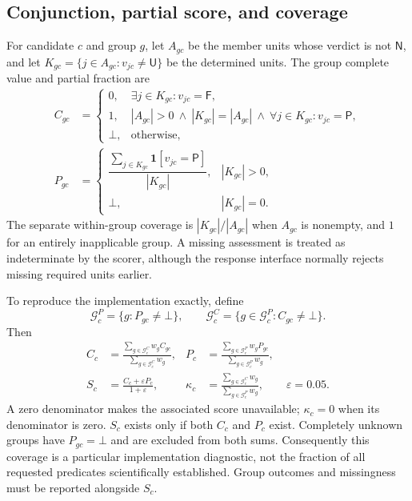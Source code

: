 \documentclass[11pt]{article}
\newcommand{\ind}{\mathbf{1}}
\newcommand{\unknown}{\bot}
\newcommand{\PASS}{\mathsf{P}}
\newcommand{\FAIL}{\mathsf{F}}
\newcommand{\UNK}{\mathsf{U}}
\newcommand{\NA}{\mathsf{N}}
\begin{document}
\subsection{Conjunction, partial score, and coverage}
For candidate $c$ and group $g$, let $A_{gc}$ be the member units whose verdict is
not $\NA$, and let $K_{gc}=\{j\in A_{gc}:v_{jc}\ne\UNK\}$ be the determined
units. The group complete value and partial fraction are
\begin{align}
 C_{gc}&=\begin{cases}
 0,&\exists j\in K_{gc}:v_{jc}=\FAIL,\\
 1,&|A_{gc}|>0\ \land\ |K_{gc}|=|A_{gc}|\ \land\
       \forall j\in K_{gc}:v_{jc}=\PASS,\\
 \unknown,&\text{otherwise},
 \end{cases}\\
 P_{gc}&=\begin{cases}
 \dfrac{\sum_{j\in K_{gc}}\ind[v_{jc}=\PASS]}{|K_{gc}|},&|K_{gc}|>0,\\
 \unknown,&|K_{gc}|=0.
 \end{cases}
 \label{eq:group}
\end{align}
The separate within-group coverage is $|K_{gc}|/|A_{gc}|$ when $A_{gc}$ is
nonempty, and $1$ for an entirely inapplicable group. A missing assessment is
treated as indeterminate by the scorer, although the response interface normally
rejects missing required units earlier.

To reproduce the implementation exactly, define
\begin{equation}
 \mathcal G_c^P=\{g:P_{gc}\ne\unknown\},\qquad
 \mathcal G_c^C=\{g\in\mathcal G_c^P:C_{gc}\ne\unknown\}.
\end{equation}
Then
\begin{align}
 C_c&=\frac{\sum_{g\in\mathcal G_c^C}w_g C_{gc}}
               {\sum_{g\in\mathcal G_c^C}w_g},&
 P_c&=\frac{\sum_{g\in\mathcal G_c^P}w_g P_{gc}}
               {\sum_{g\in\mathcal G_c^P}w_g},\\
 S_c&=\frac{C_c+\varepsilon P_c}{1+\varepsilon},&
 \kappa_c&=\frac{\sum_{g\in\mathcal G_c^C}w_g}
                    {\sum_{g\in\mathcal G_c^P}w_g},\qquad\varepsilon=0.05.
 \label{eq:shaped}
\end{align}
A zero denominator makes the associated score unavailable; $\kappa_c=0$ when
its denominator is zero. $S_c$ exists only if both $C_c$ and $P_c$ exist.
Completely unknown groups have $P_{gc}=\unknown$ and are excluded from both sums.
Consequently this coverage is a particular implementation diagnostic, not the
fraction of all requested predicates scientifically established. Group outcomes
and missingness must be reported alongside $S_c$.
\end{document}
